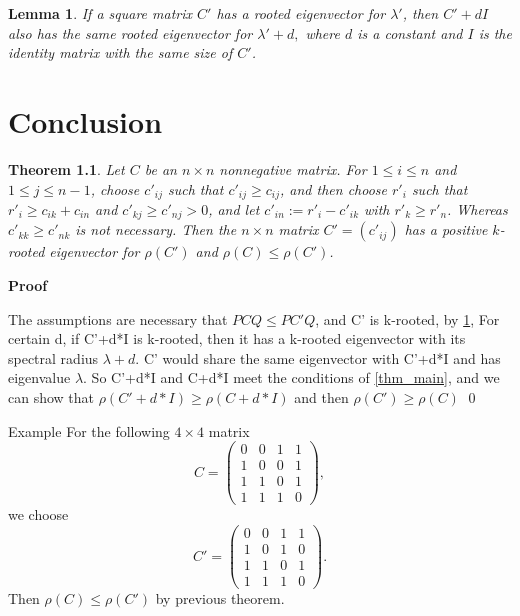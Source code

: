 \documentclass[12pt]{report}%
\theoremstyle{plain}
\newtheorem{thm}{Theorem}[chapter]
\newtheorem{lem}[thm]{Lemma}
\theoremstyle{definition}
\begin{document}
\begin{lem}\label{l_diag}
If a square matrix $C'$ has a rooted eigenvector for $\lambda'$, then $C'+dI$ also has
the same rooted eigenvector for $\lambda'+d,$ where $d$ is a constant and $I$ is the identity matrix with the same size of $C'$.
\end{lem}

\chapter{Conclusion}

\begin{thm}
Let $C$ be an $n\times n$ nonnegative matrix. For $1\leq i \leq n$ and $1\leq j\leq n-1$, choose $c'_{ij}$
such that $c'_{ij}\geq c_{ij}$, and then choose $r'_i$ such that $r'_i\geq c_{ik}+c_{in}$ and $c'_{kj}\geq c'_{nj}>0$, and
let $c'_{in}:=r'_i-c'_{ik}$ with $r'_k \geq r'_n$. Whereas $c'_{kk}\geq c'_{nk}$ is not necessary. Then the $n\times n$ matrix $C'=(c'_{ij})$ has a positive $k$-rooted eigenvector for $\rho(C')$ and $\rho(C)\leq \rho(C')$.
\end{thm}



{\bf Proof}

The assumptions are necessary that $PCQ \leq PC'Q$, and C' is k-rooted, by \ref{l_diag}, For certain d, if C'+d*I is k-rooted, then it has a k-rooted eigenvector with its spectral radius $\lambda + d$. C' would share the same eigenvector with C'+d*I and has eigenvalue $\lambda$. So C'+d*I and C+d*I meet the conditions of \ref{thm_main}, and we can show that $\rho(C' + d*I) \geq \rho(C +d*I)$ and then $\rho(C') \geq \rho(C)$  \qed



{Example}
For the following $4\times 4$ matrix
$$C=\begin{pmatrix}
0 & 0 & 1 & 1\\
1 & 0 & 0 & 1\\
1 & 1 & 0 & 1\\
1 & 1 & 1 & 0
\end{pmatrix},$$
we choose
$$C'=\begin{pmatrix}
0 & 0 & 1 & 1\\
1 & 0 & 1 &  0\\
1 & 1 & 0 & 1\\
1 & 1 & 1 & 0
\end{pmatrix}.$$
Then
$\rho(C)\leq \rho(C')$ by previous theorem.
\end{document}
